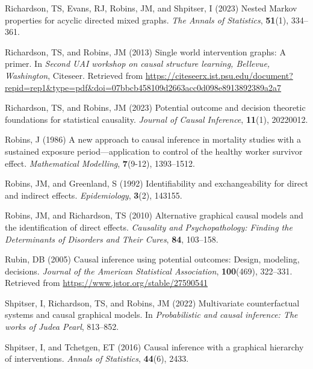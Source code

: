 \documentclass[
  single column]{article}
\newlength{\cslhangindent}
\newenvironment{CSLReferences}[2] %
 {\begin{list}{}{%
  \setlength{\itemindent}{0pt}
  \setlength{\leftmargin}{0pt}
  \setlength{\parsep}{0pt}
  \ifodd #1
   \setlength{\leftmargin}{\cslhangindent}
   \setlength{\itemindent}{-1\cslhangindent}
  \fi
  \setlength{\itemsep}{#2\baselineskip}}}
 {\end{list}}
\begin{document}
\begin{CSLReferences}{1}{0}
Richardson, TS, Evans, RJ, Robins, JM, and Shpitser, I (2023) Nested
{M}arkov properties for acyclic directed mixed graphs. \emph{The Annals
of Statistics}, \textbf{51}(1), 334--361.

Richardson, TS, and Robins, JM (2013) Single world intervention graphs:
A primer. In \emph{Second UAI workshop on causal structure learning,
{B}ellevue, {W}ashington}, Citeseer. Retrieved from
\url{https://citeseerx.ist.psu.edu/document?repid=rep1&type=pdf&doi=07bbcb458109d2663acc0d098e8913892389a2a7}

Richardson, TS, and Robins, JM (2023) Potential outcome and decision
theoretic foundations for statistical causality. \emph{Journal of Causal
Inference}, \textbf{11}(1), 20220012.

Robins, J (1986) A new approach to causal inference in mortality studies
with a sustained exposure period---application to control of the healthy
worker survivor effect. \emph{Mathematical Modelling}, \textbf{7}(9-12),
1393--1512.

Robins, JM, and Greenland, S (1992) Identifiability and exchangeability
for direct and indirect effects. \emph{Epidemiology}, \textbf{3}(2),
143155.

Robins, JM, and Richardson, TS (2010) Alternative graphical causal
models and the identification of direct effects. \emph{Causality and
Psychopathology: Finding the Determinants of Disorders and Their Cures},
\textbf{84}, 103--158.

Rubin, DB (2005) Causal inference using potential outcomes: Design,
modeling, decisions. \emph{Journal of the American Statistical
Association}, \textbf{100}(469), 322--331. Retrieved from
\url{https://www.jstor.org/stable/27590541}

Shpitser, I, Richardson, TS, and Robins, JM (2022) Multivariate
counterfactual systems and causal graphical models. In
\emph{Probabilistic and causal inference: The works of {J}udea {P}earl},
813--852.

Shpitser, I, and Tchetgen, ET (2016) Causal inference with a graphical
hierarchy of interventions. \emph{Annals of Statistics}, \textbf{44}(6),
2433.


\end{CSLReferences}
\end{document}
